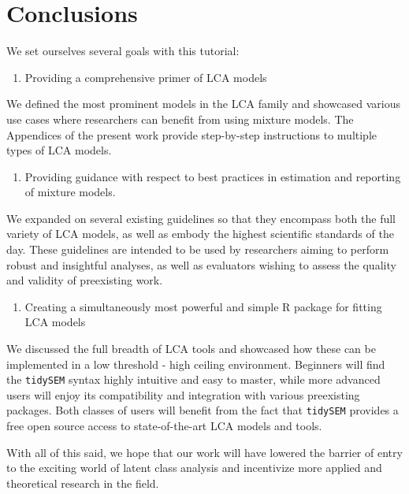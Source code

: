 \documentclass[
  ,man,floatsintext]{apa6}
\providecommand{\tightlist}{%
  \setlength{\itemsep}{0pt}\setlength{\parskip}{0pt}}
\begin{document}
\hypertarget{conclusions}{%
\section{Conclusions}\label{conclusions}}

We set ourselves several goals with this tutorial:

\begin{enumerate}
\def\labelenumi{(\arabic{enumi})}
\tightlist
\item
  Providing a comprehensive primer of LCA models
\end{enumerate}

We defined the most prominent models in the LCA family and showcased various use cases where researchers can benefit from using
mixture models. The Appendices of the present work provide step-by-step instructions to multiple types of LCA models.

\begin{enumerate}
\def\labelenumi{(\arabic{enumi})}
\setcounter{enumi}{1}
\tightlist
\item
  Providing guidance with respect to best practices in estimation and reporting of mixture models.
\end{enumerate}

We expanded on several existing guidelines so that they encompass both the full variety of LCA models,
as well as embody the highest scientific standards of the day. These guidelines are intended to be used
by researchers aiming to perform robust and insightful analyses, as well as evaluators wishing to assess the quality and validity of preexisting work.

\begin{enumerate}
\def\labelenumi{(\arabic{enumi})}
\setcounter{enumi}{2}
\tightlist
\item
  Creating a simultaneously most powerful and simple R package for fitting LCA models
\end{enumerate}

We discussed the full breadth of LCA tools and showcased how these can be implemented in a low threshold - high ceiling environment.
Beginners will find the \texttt{tidySEM} syntax highly intuitive and easy to master, while more advanced users will enjoy its compatibility and integration with various preexisting packages. Both classes of users will benefit from the fact that \texttt{tidySEM} provides a free open source access to state-of-the-art LCA models and tools.

With all of this said, we hope that our work will have lowered the barrier of entry to the exciting world of latent class analysis and incentivize more applied and theoretical research in the field.
\end{document}
